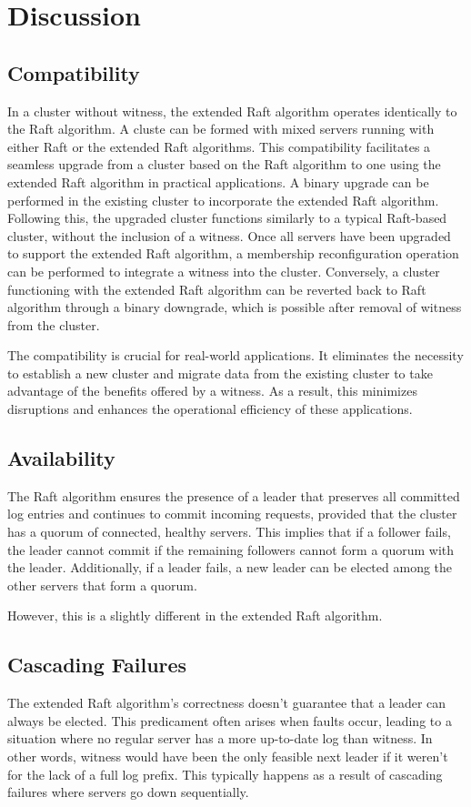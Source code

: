 \section{Discussion}


\subsection{Compatibility}\label{subsection:compatibility}
In a cluster without witness, the extended Raft algorithm operates identically to the Raft algorithm. A cluste can be formed with mixed servers running with either Raft or the extended Raft algorithms. This compatibility facilitates a seamless upgrade from a cluster based on the Raft algorithm to one using the extended Raft algorithm in practical applications. A binary upgrade can be performed in the existing cluster to incorporate the extended Raft algorithm. Following this, the upgraded cluster functions similarly to a typical Raft-based cluster, without the inclusion of a witness. Once all servers have been upgraded to support the extended Raft algorithm, a membership reconfiguration operation can be performed to integrate a witness into the cluster. Conversely, a cluster functioning with the extended Raft algorithm can be reverted back to Raft algorithm through a binary downgrade, which is possible after removal of witness from the cluster.

The compatibility is crucial for real-world applications. It eliminates the necessity to establish a new cluster and migrate data from the existing cluster to take advantage of the benefits offered by a witness. As a result, this minimizes disruptions and enhances the operational efficiency of these applications.

\subsection{Availability}
The Raft algorithm ensures the presence of a leader that preserves all committed log entries and continues to commit incoming requests, provided that the cluster has a quorum of connected, healthy servers. This implies that if a follower fails, the leader cannot commit if the remaining followers cannot form a quorum with the leader. Additionally, if a leader fails, a new leader can be elected among the other servers that form a quorum.

However, this is a slightly different in the extended Raft algorithm.
\subsection{Cascading Failures}
The extended Raft algorithm's correctness doesn't guarantee that a leader can always be elected. This predicament often arises when faults occur, leading to a situation where no regular server has a more up-to-date log than witness. In other words, witness would have been the only feasible next leader if it weren't for the lack of a full log prefix. This typically happens as a result of cascading failures where servers go down sequentially.

